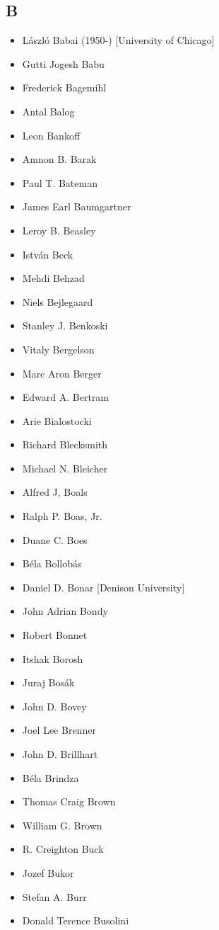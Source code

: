 \documentclass[12pt]{article}
\begin{document}
\subsection{B}
\begin{itemize}
\item L\'{a}szl\'{o} Babai (1950-) [University of Chicago]
\item Gutti Jogesh Babu
\item Frederick Bagemihl
\item Antal Balog
\item Leon Bankoff
\item Amnon B. Barak
\item Paul T. Bateman
\item James Earl Baumgartner
\item Leroy B. Beasley
\item Istv\'{a}n Beck
\item Mehdi Behzad
\item Niels Bejlegaard
\item Stanley J. Benkoski
\item Vitaly Bergelson
\item Marc Aron Berger
\item Edward A. Bertram
\item Arie Bialostocki
\item Richard Blecksmith
\item Michael N. Bleicher
\item Alfred J, Boals
\item Ralph P. Boas, Jr.
\item Duane C. Boes
\item B\'{e}la Bollob\'{a}s
\item Daniel D. Bonar [Denison University]
\item John Adrian Bondy
\item Robert Bonnet
\item Itshak Borosh
\item Juraj Bos\'{a}k
\item John D. Bovey
\item Joel Lee Brenner
\item John D. Brillhart
\item B\'{e}la Brindza
\item Thomas Craig Brown
\item William G. Brown
\item R. Creighton Buck
\item Jozef Bukor 
\item Stefan A. Burr
\item Donald Terence Busolini
\end{itemize}
\end{document}
